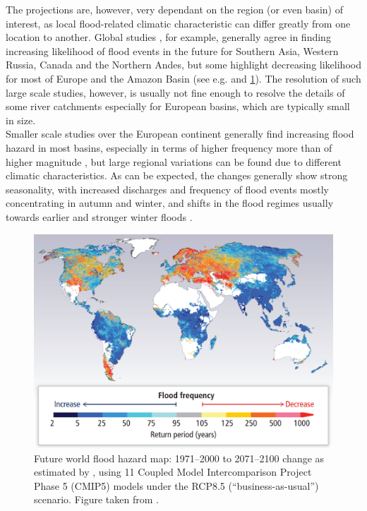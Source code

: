 The projections are, however, very dependant on the region (or even basin) of interest, as local flood-related climatic characteristic can differ greatly from one location to another.
Global studies \citep{Hirabayashi2013, Arnell2016, Dankers2014, Hirabayashi2008, Alfieri2017, Milly2002}, for example, generally agree in finding increasing likelihood of flood events in the future for Southern Asia, Western Russia, Canada and the Northern Andes, but some highlight decreasing likelihood for most of Europe and the Amazon Basin (see e.g. \citet{Arnell2016, Hirabayashi2013, Dankers2014} and \cref{fig:future_flood}).
The resolution of such large scale studies, however, is usually not fine enough to resolve the details of some river catchments \citep{Whitfield2012, Gosling2011} especially for European basins, which are typically small in size.\\
Smaller scale studies over the European continent \citep[e.g.][]{Dankers2009, Alfieri2015a, Prudhomme2003, Alfieri2018, Feyen2012} generally find increasing flood hazard in most basins, especially in terms of higher frequency more than of higher magnitude \citep{Alfieri2015a, Lehner2006}, but large regional variations can be found due to different climatic characteristics.
As can be expected, the changes generally show strong seasonality, with increased discharges and frequency of flood events mostly concentrating in autumn and winter, and shifts in the flood regimes usually towards earlier and stronger winter floods \citep[e.g.][]{Middelkoop2001, Arheimer2015, coppola2014ChahydconPobasundglowar}.

\begin{figure}
    \centering
    \includegraphics[width=\textwidth]{figures/Hirabayashi2013}
    \decoRule
    \caption[Future world flood hazard map]{Future world flood hazard map: 1971--2000 to 2071--2100 change as estimated by   \citet{Hirabayashi2013}, using 11 Coupled Model Intercomparison Project Phase 5 (CMIP5) models under the RCP8.5 (``business-as-usual'') scenario. Figure taken from \citet[][section 3.4.8]{Aalst2014}.}
    \label{fig:future_flood}
\end{figure}

